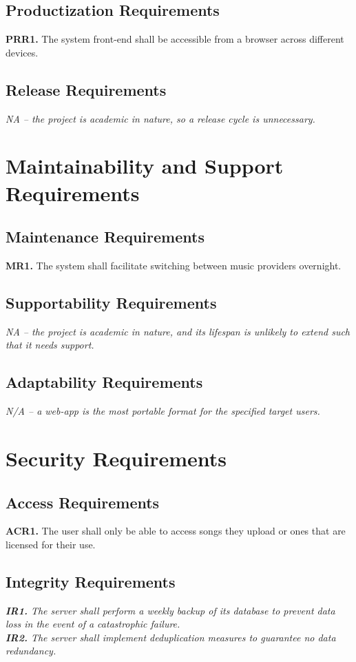 \documentclass[12pt]{article}
\begin{document}
\subsection{Productization Requirements}
\textbf{PRR1.} The system front-end shall be accessible from a browser across different devices.
\subsection{Release Requirements}
\emph{NA -- the project is academic in nature, so a release cycle is unnecessary.}

\section{Maintainability and Support Requirements}
\subsection{Maintenance Requirements}
\textbf{MR1.} The system shall facilitate switching between music providers overnight.
\subsection{Supportability Requirements}
\emph{NA -- the project is academic in nature, and its lifespan is unlikely to extend such that it needs support.}
\subsection{Adaptability Requirements}
\emph{N/A -- a web-app is the most portable format for the specified target users.}

\section{Security Requirements}
\subsection{Access Requirements}
\textbf{ACR1.} The user shall only be able to access songs they upload or ones that are licensed for their use.
\subsection{Integrity Requirements}
\emph{\textbf{IR1.} The server shall perform a weekly backup of its database to prevent data loss in the event of a catastrophic failure.} \\
\emph{\textbf{IR2.} The server shall implement deduplication measures to guarantee no data redundancy.}
\end{document}
